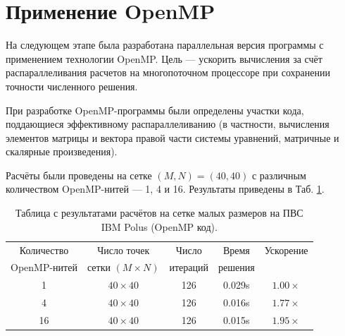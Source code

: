 \documentclass[12pt,a4paper]{article}
\begin{document}
    \section{Применение OpenMP}

    На следующем этапе была разработана параллельная версия программы с применением технологии OpenMP. Цель --- ускорить вычисления за счёт распараллеливания расчетов на многопоточном процессоре при сохранении точности численного решения.
    
    При разработке OpenMP-программы были определены участки кода, поддающиеся эффективному распараллеливанию (в частности, вычисления элементов матрицы и вектора правой части системы уравнений, матричные и скалярные произведения).

    Расчёты были проведены на сетке $(M, N) = (40, 40)$ с различным количеством OpenMP-нитей — 1, 4 и 16. Результаты приведены в Таб. \ref{tab:open_small}.

    \begin{table}[h!]
        \centering
        \begin{tabular}{c|c|c|c|c}
            \hline
            Количество & Число точек & Число & Время & Ускорение \\
            OpenMP-нитей & сетки $ (M \times N) $ & итераций & решения &  \\ \hline
            1  & $40 \times 40$ & 126 & 0.029s & $1.00\times$ \\
            4  & $40 \times 40$ & 126 & 0.016s & $1.77\times$ \\
            16 & $40 \times 40$ & 126 & 0.015s & $1.95\times$ \\
        \end{tabular}
        \caption{Таблица с результатами расчётов на сетке малых размеров на ПВС IBM Polus (OpenMP код).}
        \label{tab:open_small}
    \end{table}
    
\end{document}
